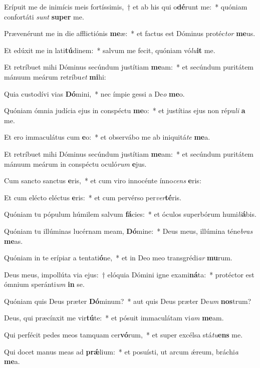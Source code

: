 \item Erípuit me de inimícis meis fortíssimis,~† et ab his qui o\textbf{dé}runt me:~* quóniam confortáti \textit{sunt} \textbf{su}\textbf{per} me.
\item Prævenérunt me in die afflictiónis \textbf{me}æ:~* et factus est Dóminus protéc\textit{tor} \textbf{me}us.
\item Et edúxit me in lati\textbf{tú}dinem:~* salvum me fecit, quóniam vó\textit{lu}\textbf{it} me.
\item Et retríbuet mihi Dóminus secúndum justítiam \textbf{me}am:~* et secúndum puritátem mánuum meárum retríbu\textit{et} \textbf{mi}hi:
\item Quia custodívi vias \textbf{Dó}mini,~* nec ímpie gessi a De\textit{o} \textbf{me}o.
\item Quóniam ómnia judícia ejus in conspéctu \textbf{me}o:~* et justítias ejus non répu\textit{li} \textbf{a} me.
\item Et ero immaculátus cum \textbf{e}o:~* et observábo me ab iniquitá\textit{te} \textbf{me}a.
\item Et retríbuet mihi Dóminus secúndum justítiam \textbf{me}am:~* et secúndum puritátem mánuum meárum in conspéctu oculó\textit{rum} \textbf{e}jus.
\item Cum sancto sanctus \textbf{e}ris,~* et cum viro innocénte ínno\textit{cens} \textbf{e}ris:
\item Et cum elécto eléctus \textbf{e}ris:~* et cum pervérso per\textit{ver}\textbf{té}ris.
\item Quóniam tu pópulum húmilem salvum \textbf{fá}cies:~* et óculos superbórum humi\textit{li}\textbf{á}bis.
\item Quóniam tu illúminas lucérnam meam, \textbf{Dó}mine:~* Deus meus, illúmina téne\textit{bras} \textbf{me}as.
\item Quóniam in te erípiar a tentati\textbf{ó}ne,~* et in Deo meo transgrédi\textit{ar} \textbf{mu}rum.
\item Deus meus, impollúta via ejus:~† elóquia Dómini igne exami\textbf{ná}ta:~* protéctor est ómnium speránti\textit{um} \textbf{in} se.
\item Quóniam quis Deus præter \textbf{Dó}minum?~* aut quis Deus præter De\textit{um} \textbf{nos}trum?
\item Deus, qui præcínxit me vir\textbf{tú}te:~* et pósuit immaculátam vi\textit{am} \textbf{me}am.
\item Qui perfécit pedes meos tamquam cer\textbf{vó}rum,~* et super excélsa stá\textit{tu}\textbf{ens} me.
\item Qui docet manus meas ad \textbf{prǽ}lium:~* et posuísti, ut arcum ǽreum, bráchi\textit{a} \textbf{me}a.
